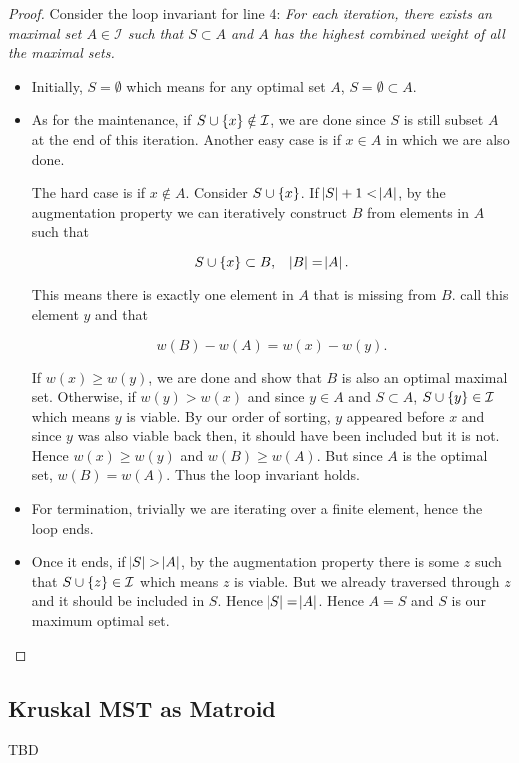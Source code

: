 \begin{proof}
Consider the loop invariant for line 4: 
\textit{For each iteration, there exists an maximal set $A \in \mathcal{I}$ such that $S \subset A$ and $A$ has the highest combined weight of all the maximal sets. }

\begin{itemize}
    \item Initially, $S=\emptyset$ which means for any optimal set $A$, $S=\emptyset\subset A$. 
    \item As for the maintenance, if $S \cup \cbr{x} \notin \mathcal{I}$, we are done since $S$ is still subset $A$ at the end of this iteration. 
    Another easy case is if $x \in A$ in which we are also done. 

    The hard case is if $x \notin A$. 
    Consider $S \cup \cbr{x}$. If $\abs{S}+1<\abs{A}$, by the augmentation property we can iteratively construct $B$ from elements in $A$ such that 

    \[
        S \cup \cbr{x} \subset B, \quad \abs{B}=\abs{A}. 
    \]

    This means there is exactly one element in $A$ that is missing from $B$. call this element $y$ and that 

    \[
        w(B)-w(A)=w(x)-w(y). 
    \]

    If $w(x)\ge w(y)$, we are done and show that $B$ is also an optimal maximal set. 
    Otherwise, if $w(y)>w(x)$ and since $y \in A$ and $S \subset A$, $S \cup \cbr{y} \in \mathcal{I}$ which means $y$ is viable. 
    By our order of sorting, $y$ appeared before $x$ and since $y$ was also viable back then, it should have been included but it is not. 
    Hence $w(x) \ge w(y)$ and $w(B)\ge w(A)$. But since $A$ is the optimal set, $w(B)=w(A)$.
    Thus the loop invariant holds.

    \item For termination, trivially we are iterating over a finite element, hence the loop ends. 

    \item Once it ends, if $\abs{S}>\abs{A}$, by the augmentation property there is some $z$ such that $S \cup \cbr{z} \in \mathcal{I}$ which means $z$ is viable. 
    But we already traversed through $z$ and it should be included in $S$. Hence $\abs{S}=\abs{A}$. Hence $A=S$ and $S$ is our maximum optimal set. 
\end{itemize}
\end{proof}

\subsection{Kruskal MST as Matroid}

TBD
